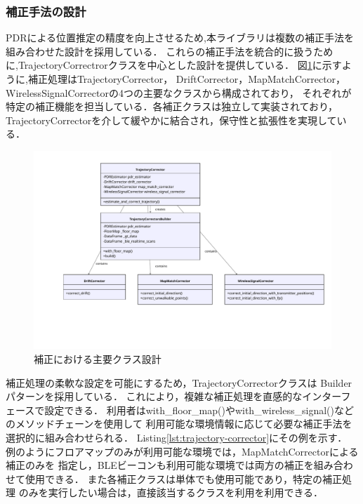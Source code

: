 
\subsubsection{補正手法の設計}

PDRによる位置推定の精度を向上させるため,本ライブラリは複数の補正手法を
組み合わせた設計を採用している．
これらの補正手法を統合的に扱うために,TrajectoryCorrectrorクラスを中心とした設計を提供している．
図\ref{fig:corrector-class}に示すように,補正処理はTrajectoryCorrector，
DriftCorrector，MapMatchCorrector，WirelessSignalCorrectorの4つの主要なクラスから構成されており，
それぞれが特定の補正機能を担当している．各補正クラスは独立して実装されており，
TrajectoryCorrectorを介して緩やかに結合され，保守性と拡張性を実現している．

\begin{figure}[H]
    \centering
    \includegraphics[width=\linewidth]{../image/trajectory_corrector.pdf}
    \caption{補正における主要クラス設計}
    \label{fig:corrector-class}
\end{figure}

補正処理の柔軟な設定を可能にするため，TrajectoryCorrectorクラスは
Builderパターンを採用している．
これにより，複雑な補正処理を直感的なインターフェースで設定できる．
利用者はwith\_floor\_map()やwith\_wireless\_signal()などのメソッドチェーンを使用して
利用可能な環境情報に応じて必要な補正手法を選択的に組み合わせられる．
Listing\ref{lst:trajectory-corrector}にその例を示す．
例のようにフロアマップのみが利用可能な環境では，MapMatchCorrectorによる補正のみを
指定し，BLEビーコンも利用可能な環境では両方の補正を組み合わせて使用できる．
また各補正クラスは単体でも使用可能であり，特定の補正処理
のみを実行したい場合は，直接該当するクラスを利用を利用できる．


